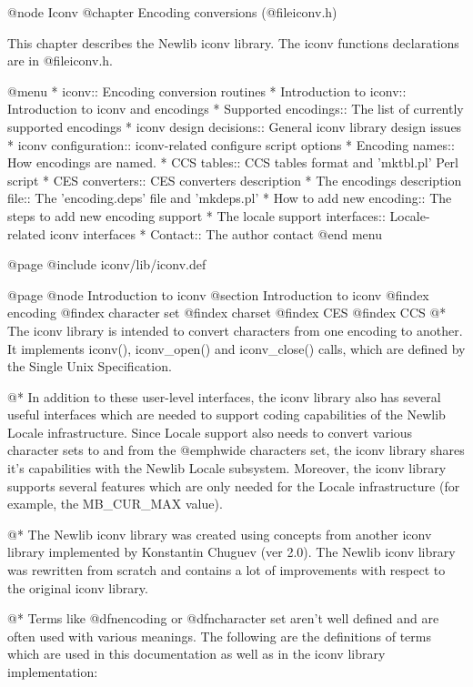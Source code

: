 @node Iconv
@chapter Encoding conversions (@file{iconv.h})

This chapter describes the Newlib iconv library.
The iconv functions declarations are in
@file{iconv.h}.

@menu
* iconv::                           Encoding conversion routines
* Introduction to iconv::           Introduction to iconv and encodings
* Supported encodings::             The list of currently supported encodings
* iconv design decisions::          General iconv library design issues
* iconv configuration::             iconv-related configure script options
* Encoding names::                  How encodings are named.
* CCS tables::                      CCS tables format and 'mktbl.pl' Perl script
* CES converters::                  CES converters description
* The encodings description file::  The 'encoding.deps' file and 'mkdeps.pl'
* How to add new encoding::         The steps to add new encoding support
* The locale support interfaces::   Locale-related iconv interfaces
* Contact::                         The author contact
@end menu

@page
@include iconv/lib/iconv.def

@page
@node Introduction to iconv
@section Introduction to iconv
@findex encoding
@findex character set
@findex charset
@findex CES
@findex CCS
@*
The iconv library is intended to convert characters from one encoding to
another. It implements iconv(), iconv_open() and iconv_close()
calls, which are defined by the Single Unix Specification.

@*
In addition to these user-level interfaces, the iconv library also has
several useful interfaces which are needed to support coding
capabilities of the Newlib Locale infrastructure.  Since Locale 
support also needs to
convert various character sets to and from the @emph{wide characters
set}, the iconv library shares it's capabilities with the Newlib Locale
subsystem. Moreover, the iconv library supports several features which are
only needed for the Locale infrastructure (for example, the MB_CUR_MAX value).

@*
The Newlib iconv library was created using concepts from another iconv
library implemented by Konstantin Chuguev (ver 2.0). The Newlib iconv library
was rewritten from scratch and contains a lot of improvements with respect to
the original iconv library. 

@*
Terms like @dfn{encoding} or @dfn{character set} aren't well defined and
are often used with various meanings. The following are the definitions of terms
which are used in this documentation as well as in the iconv library
implementation:


